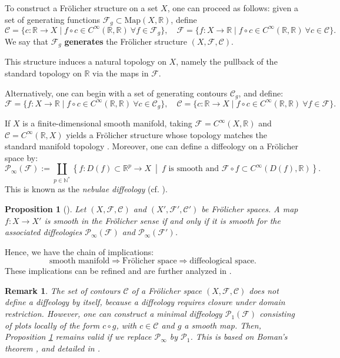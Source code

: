 \documentclass{amsart}
\def\R{\mathbb{R}}
\newcounter{thm}
\newcounter{ex}
\newcounter{re}
\newtheorem{Proposition}[thm]{Proposition}
\newtheorem{remark}[thm]{Remark}
\begin{document}
To construct a Fr\"olicher structure on a set $X$, one can proceed as follows: given a set of generating functions $\mathcal{F}_g \subset \mathrm{Map}(X, \R)$, define
\[
\mathcal{C} = \{ c: \R \to X \mid f \circ c \in C^\infty(\R, \R)\ \forall f \in \mathcal{F}_g \}, \quad
\mathcal{F} = \{ f: X \to \R \mid f \circ c \in C^\infty(\R, \R)\ \forall c \in \mathcal{C} \}.
\]
We say that $\mathcal{F}_g$ \textbf{generates} the Fr\"olicher structure $(X, \mathcal{F}, \mathcal{C})$.

This structure induces a natural topology on $X$, namely the pullback of the standard topology on $\R$ via the maps in $\mathcal{F}$.

Alternatively, one can begin with a set of generating contours $\mathcal{C}_g$, and define:
\[
\mathcal{F} = \{ f: X \to \R \mid f \circ c \in C^\infty(\R, \R)\ \forall c \in \mathcal{C}_g \}, \quad
\mathcal{C} = \{ c: \R \to X \mid f \circ c \in C^\infty(\R, \R)\ \forall f \in \mathcal{F} \}.
\]

If $X$ is a finite-dimensional smooth manifold, taking $\mathcal{F} = C^\infty(X, \R)$ and $\mathcal{C} = C^\infty(\R, X)$ yields a Fr\"olicher structure whose topology matches the standard manifold topology \cite{KM}.
Moreover, one can define a diffeology on a Fr\"olicher space by:
\begin{equation} \label{neb}
\mathcal{P}_\infty(\mathcal{F}) := \coprod_{p \in \mathbb{N}^*} \left\{ f: D(f) \subset \R^p \to X \ \middle| \ f \text{ is smooth and } \mathcal{F} \circ f \subset C^\infty(D(f), \R) \right\}.
\end{equation}
This is known as the \emph{nebulae diffeology} (cf. \cite{Igdiff}).

\begin{Proposition}[{\cite{Ma2006-3}}] \label{fd}
	Let $(X, \mathcal{F}, \mathcal{C})$ and $(X', \mathcal{F}', \mathcal{C}')$ be Fr\"olicher spaces. A map $f: X \to X'$ is smooth in the Fr\"olicher sense if and only if it is smooth for the associated diffeologies $\mathcal{P}_\infty(\mathcal{F})$ and $\mathcal{P}_\infty(\mathcal{F}')$.
\end{Proposition}

Hence, we have the chain of implications:
\[
\text{smooth manifold} \Rightarrow \text{Fr\"olicher space} \Rightarrow \text{diffeological space}.
\]
These implications can be refined and are further analyzed in \cite{Wa, Ma2006-3}.

\begin{remark}
	The set of contours $\mathcal{C}$ of a Fr\"olicher space $(X, \mathcal{F}, \mathcal{C})$ does not define a diffeology by itself, because a diffeology requires closure under domain restriction. However, one can construct a minimal diffeology $\mathcal{P}_1(\mathcal{F})$ consisting of plots locally of the form $c \circ g$, with $c \in \mathcal{C}$ and $g$ a smooth map. Then, Proposition \ref{fd} remains valid if we replace $\mathcal{P}_\infty$ by $\mathcal{P}_1$. This is based on Boman's theorem \cite[p.~26]{KM}, and detailed in \cite{Ma2013, Ma2006-3, Wa}.
\end{remark}
\end{document}
